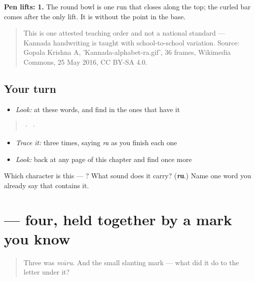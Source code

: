 \textbf{Pen lifts: 1.} The round bowl is one run that closes along the top; the curled bar comes after the only lift. It is  without the point in the base.

\begin{quote}
This is one attested teaching order and not a national standard — Kannada handwriting is taught with school-to-school variation. Source: Gopala Krishna A, 'Kannada-alphabet-ra.gif', 36 frames, Wikimedia Commons, 25 May 2016, CC BY-SA 4.0.
\end{quote}

\subsection*{Your turn}
\begin{itemize}
\raggedright
  \item \emph{Look:} at these words, and find  in the ones that have it
\end{itemize}

\begin{quote}
  ·    ·  
\end{quote}

\begin{itemize}
\raggedright
  \item \emph{Trace it:}  three times, saying \emph{ra} as you finish each one
  \item \emph{Look:} back at any page of this chapter and find  once more
\end{itemize}

\begin{tcolorbox}[breakable,colback=teal!4,colframe=teal!35!black,title={Before you move on}]
Which character is this — ? What sound does it carry? (\emph{\textbf{ra}}.) Name one word you already say that contains it.
\end{tcolorbox}
\section[\texorpdfstring{\kn{ನಾಲ್ಕು} (nālku)}{ನಾಲ್ಕು (nālku)}]{ — four, held together by a mark you know}

\label{lesson:KA-C07-naalku}



\begin{quote}
Three was \emph{mūru}. And the small slanting mark \textbf{} — what did it do to the letter under it?
\end{quote}

